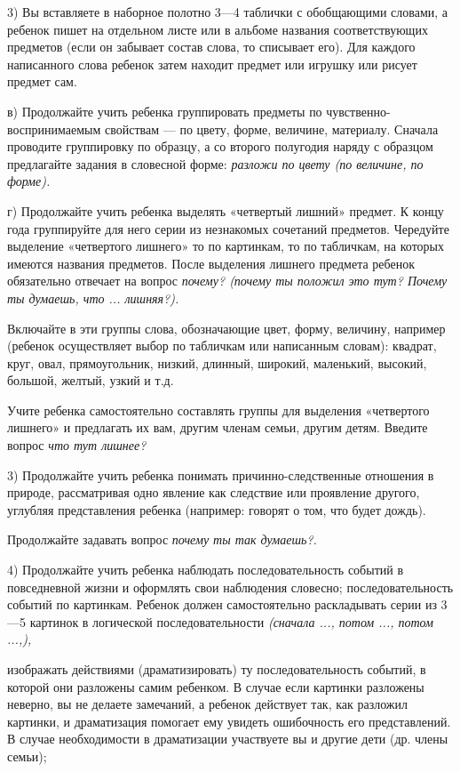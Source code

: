 \documentclass{book}
\renewcommand{\emph}[1]{\textit{#1}}
\begin{document}
3) Вы вставляете в наборное полотно 3---4 таблички с обобщающими
словами, а ребенок пишет на отдельном листе или в альбоме названия
соответствующих предметов (если он забывает состав слова, то списывает
его). Для каждого написанного слова ребенок затем находит предмет или
игрушку или рисует предмет сам.

в) Продолжайте учить ребенка группировать предметы по
чувственно-воспринимаемым свойствам --- по цвету, форме, величине,
материалу. Сначала проводите группировку по образцу, а со второго
полугодия наряду с образцом предлагайте задания в словесной форме:
\emph{разложи по цвету (по величине, по форме).}

г) Продолжайте учить ребенка выделять «четвертый лишний» предмет. К
концу года группируйте для него серии из незнакомых сочетаний предметов.
Чередуйте выделение «четвертого лишнего» то по картинкам, то по
табличкам, на которых имеются названия предметов. После выделения
лишнего предмета ребенок обязательно отвечает на вопрос \emph{почему?
(почему ты положил это тут? Почему ты думаешь, что ... лишняя?).}

Включайте в эти группы слова, обозначающие цвет, форму, величину,
например (ребенок осуществляет выбор по табличкам или написанным
словам): квадрат, круг, овал, прямоугольник, низкий, длинный, широкий,
маленький, высокий, большой, желтый, узкий и т.д.

Учите ребенка самостоятельно составлять группы для выделения «четвертого
лишнего» и предлагать их вам, другим членам семьи, другим детям. Введите
вопрос \emph{что тут лишнее?}

3) Продолжайте учить ребенка понимать причинно-следственные отношения в
природе, рассматривая одно явление как следствие или проявление другого,
углубляя представления ребенка (например: говорят о том, что будет
дождь).

Продолжайте задавать вопрос \emph{почему ты так думаешь?.}

4) Продолжайте учить ребенка наблюдать последовательность событий в
повседневной жизни и оформлять свои наблюдения словесно;
последовательность событий по картинкам. Ребенок должен самостоятельно
раскладывать серии из 3---5 картинок в логической последовательности
\emph{(сначала ..., потом ..., потом ...,),}

изображать действиями (драматизировать) ту последовательность событий, в
которой они разложены самим ребенком. В случае если картинки разложены
неверно, вы не делаете замечаний, а ребенок действует так, как разложил
картинки, и драматизация помогает ему увидеть ошибочность его
представлений. В случае необходимости в драматизации участвуете вы и
другие дети (др. члены семьи);
\end{document}
